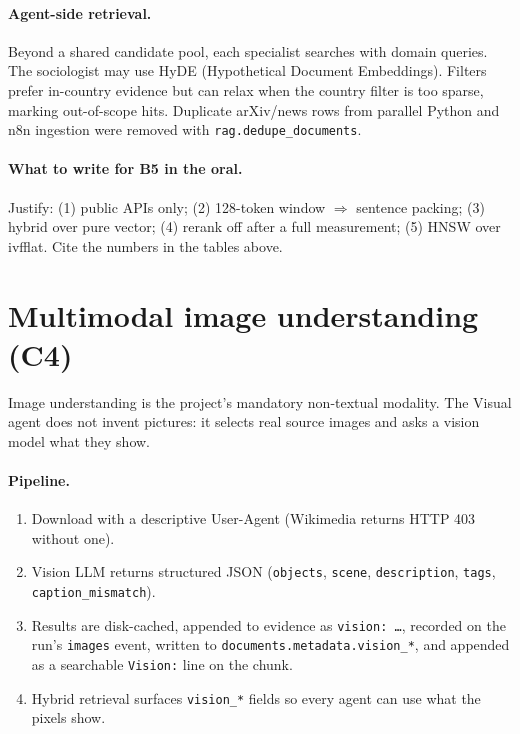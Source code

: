 \documentclass[11pt,a4paper]{article}
\begin{document}
\paragraph{Agent-side retrieval.}
Beyond a shared candidate pool, each specialist searches with domain queries. The sociologist may use HyDE (Hypothetical Document Embeddings). Filters prefer in-country evidence but can relax when the country filter is too sparse, marking out-of-scope hits. Duplicate arXiv/news rows from parallel Python and n8n ingestion were removed with \texttt{rag.dedupe\_documents}.

\paragraph{What to write for B5 in the oral.}
Justify: (1) public APIs only; (2) 128-token window $\Rightarrow$ sentence packing; (3) hybrid over pure vector; (4) rerank off after a full measurement; (5) HNSW over ivfflat. Cite the numbers in the tables above.

\section{Multimodal image understanding (C4)}

Image understanding is the project's mandatory non-textual modality. The Visual agent does not invent pictures: it selects real source images and asks a vision model what they show.

\paragraph{Pipeline.}
\begin{enumerate}
  \item Download with a descriptive User-Agent (Wikimedia returns HTTP 403 without one).
  \item Vision LLM returns structured JSON (\texttt{objects}, \texttt{scene}, \texttt{description}, \texttt{tags}, \texttt{caption\_mismatch}).
  \item Results are disk-cached, appended to evidence as \texttt{vision: \ldots}, recorded on the run's \texttt{images} event, written to \texttt{documents.metadata.vision\_*}, and appended as a searchable \texttt{Vision:} line on the chunk.
  \item Hybrid retrieval surfaces \texttt{vision\_*} fields so every agent can use what the pixels show.
\end{enumerate}
\end{document}
